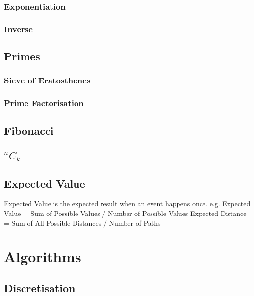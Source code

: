 \documentclass{article}
\begin{document}
\subsubsection{Exponentiation}

\subsubsection{Inverse}


\subsection{Primes}
\subsubsection{Sieve of Eratosthenes}

\subsubsection{Prime Factorisation}


\subsection{Fibonacci}

\subsection{\texorpdfstring{$^{n}C_{k}$}{}}


\subsection{Expected Value}
\begin{flushleft}
Expected Value is the expected result when an event happens once. e.g.
\newline
Expected Value = Sum of Possible Values / Number of Possible Values
\newline
Expected Distance = Sum of All Possible Distances / Number of Paths
\end{flushleft}

\section{Algorithms}
\subsection{Discretisation}

\end{document}
